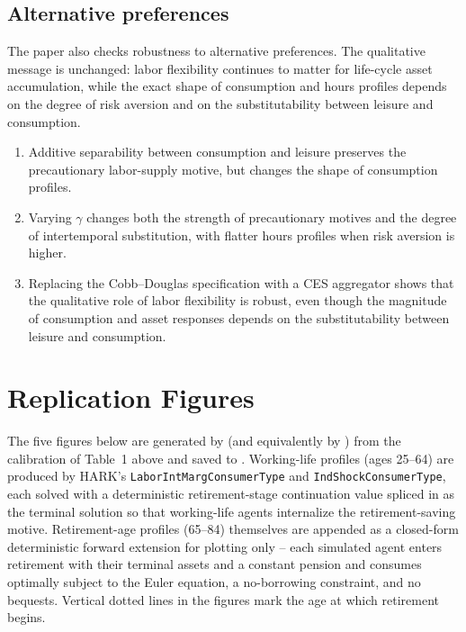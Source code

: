 \documentclass[titlepage, headings=optiontotocandhead]{econark} %
\begin{document}
\subsection{Alternative preferences}
The paper also checks robustness to alternative preferences. The qualitative message is
unchanged: labor flexibility continues to matter for life-cycle asset accumulation, while the
exact shape of consumption and hours profiles depends on the degree of risk aversion and on
the substitutability between leisure and consumption.

\begin{enumerate}
  \item Additive separability between consumption and leisure preserves the precautionary
  labor-supply motive, but changes the shape of consumption profiles.
  \item Varying $\gamma$ changes both the strength of precautionary motives and the degree of
  intertemporal substitution, with flatter hours profiles when risk aversion is higher.
  \item Replacing the Cobb--Douglas specification with a CES aggregator shows that the
  qualitative role of labor flexibility is robust, even though the magnitude of consumption and
  asset responses depends on the substitutability between leisure and consumption.
\end{enumerate}

\section{Replication Figures}\label{sec:replication_figures}

The five figures below are generated by 
(and equivalently by ) from the
calibration of Table~1 above and saved to .
Working-life profiles (ages 25--64) are produced by HARK's
\texttt{LaborIntMargConsumerType} and \texttt{IndShockConsumerType},
each solved with a deterministic retirement-stage continuation value
spliced in as the terminal solution so that working-life agents
internalize the retirement-saving motive. Retirement-age profiles
(65--84) themselves are appended as a closed-form deterministic
forward extension for plotting only -- each simulated agent enters
retirement with their terminal assets and a constant pension and
consumes optimally subject to the Euler equation, a no-borrowing
constraint, and no bequests. Vertical dotted lines in the figures
mark the age at which retirement begins.
\end{document}
